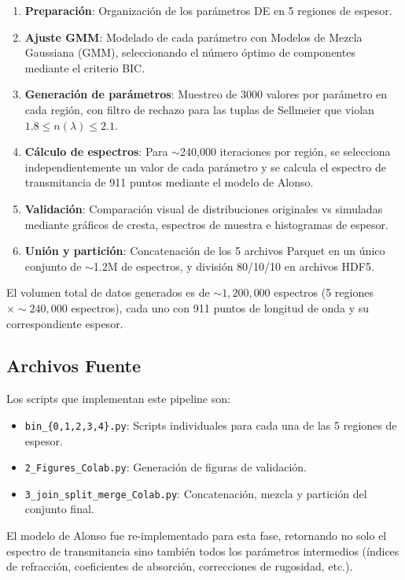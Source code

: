 \documentclass{article}
\begin{document}
\begin{enumerate}
    \item \textbf{Preparaci\'on}: Organizaci\'on de los par\'ametros DE en 5 regiones de espesor.
    \item \textbf{Ajuste GMM}: Modelado de cada par\'ametro con Modelos de Mezcla Gaussiana (GMM), seleccionando el n\'umero \'optimo de componentes mediante el criterio BIC.
    \item \textbf{Generaci\'on de par\'ametros}: Muestreo de 3000 valores por par\'ametro en cada regi\'on, con filtro de rechazo para las tuplas de Sellmeier que violan $1.8 \leq n(\lambda) \leq 2.1$.
    \item \textbf{C\'alculo de espectros}: Para $\sim$240,000 iteraciones por regi\'on, se selecciona independientemente un valor de cada par\'ametro y se calcula el espectro de transmitancia de 911 puntos mediante el modelo de Alonso.
    \item \textbf{Validaci\'on}: Comparaci\'on visual de distribuciones originales vs simuladas mediante gr\'aficos de cresta, espectros de muestra e histogramas de espesor.
    \item \textbf{Uni\'on y partici\'on}: Concatenaci\'on de los 5 archivos Parquet en un \'unico conjunto de $\sim$1.2M de espectros, y divisi\'on 80/10/10 en archivos HDF5.
\end{enumerate}

El volumen total de datos generados es de $\sim 1,200,000$ espectros (5 regiones $\times \sim 240,000$ espectros), cada uno con 911 puntos de longitud de onda y su correspondiente espesor.

\subsection{Archivos Fuente}

Los scripts que implementan este pipeline son:
\begin{itemize}
    \item \texttt{bin\_\{0,1,2,3,4\}.py}: Scripts individuales para cada una de las 5 regiones de espesor.
    \item \texttt{2\_Figures\_Colab.py}: Generaci\'on de figuras de validaci\'on.
    \item \texttt{3\_join\_split\_merge\_Colab.py}: Concatenaci\'on, mezcla y partici\'on del conjunto final.
\end{itemize}

El modelo de Alonso fue re-implementado para esta fase, retornando no solo el espectro de transmitancia sino tambi\'en todos los par\'ametros intermedios (\'indices de refracci\'on, coeficientes de absorci\'on, correcciones de rugosidad, etc.).
\end{document}
